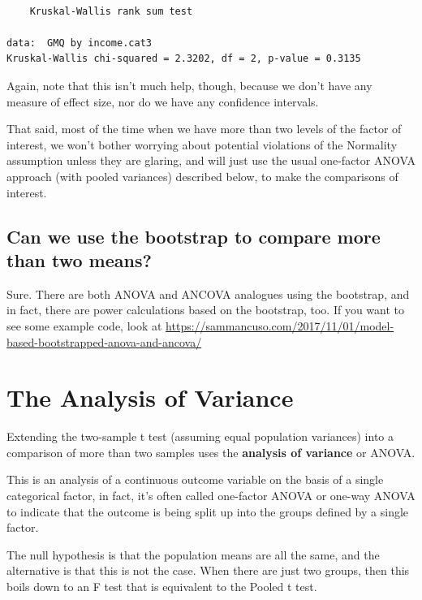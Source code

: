 \documentclass[
]{book}
\begin{document}
\begin{verbatim}

	Kruskal-Wallis rank sum test

data:  GMQ by income.cat3
Kruskal-Wallis chi-squared = 2.3202, df = 2, p-value = 0.3135
\end{verbatim}

Again, note that this isn't much help, though, because we don't have any measure of effect size, nor do we have any confidence intervals.

That said, most of the time when we have more than two levels of the factor of interest, we won't bother worrying about potential violations of the Normality assumption unless they are glaring, and will just use the usual one-factor ANOVA approach (with pooled variances) described below, to make the comparisons of interest.

\hypertarget{can-we-use-the-bootstrap-to-compare-more-than-two-means}{%
\subsection{Can we use the bootstrap to compare more than two means?}\label{can-we-use-the-bootstrap-to-compare-more-than-two-means}}

Sure. There are both ANOVA and ANCOVA analogues using the bootstrap, and in fact, there are power calculations based on the bootstrap, too. If you want to see some example code, look at \url{https://sammancuso.com/2017/11/01/model-based-bootstrapped-anova-and-ancova/}

\hypertarget{the-analysis-of-variance}{%
\section{The Analysis of Variance}\label{the-analysis-of-variance}}

Extending the two-sample t test (assuming equal population variances) into a comparison of more than two samples uses the \textbf{analysis of variance} or ANOVA.

This is an analysis of a continuous outcome variable on the basis of a single categorical factor, in fact, it's often called one-factor ANOVA or one-way ANOVA to indicate that the outcome is being split up into the groups defined by a single factor.

The null hypothesis is that the population means are all the same, and the alternative is that this is not the case. When there are just two groups, then this boils down to an F test that is equivalent to the Pooled t test.
\end{document}
